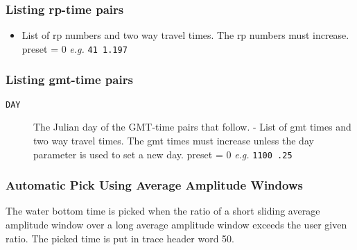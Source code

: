\subsubsection{Listing rp-time pairs}

\begin{itemize}
\item List of \gls{rp} numbers and two way travel times.  The \gls{rp} numbers must increase.  \Gls{preset} = 0     \textit{e.g.}    \texttt{41 1.197}
\end{itemize}

\subsubsection{Listing gmt-time pairs}

\begin{description}
\item[\texttt{DAY}] The Julian day of the GMT-time pairs that follow.
       - List of \gls{gmt} times and two way travel times.  The \gls{gmt} times must
         increase unless the day parameter is used to set a new day.
         \Gls{preset} = 0     \textit{e.g.}    \texttt{1100 .25}
\end{description}

\subsubsection{Automatic Pick Using Average Amplitude Windows}

    The water bottom time is picked when the ratio of a short sliding
average amplitude window over a long average amplitude window exceeds
the user given ratio.  The picked time is put in trace header word 50.

